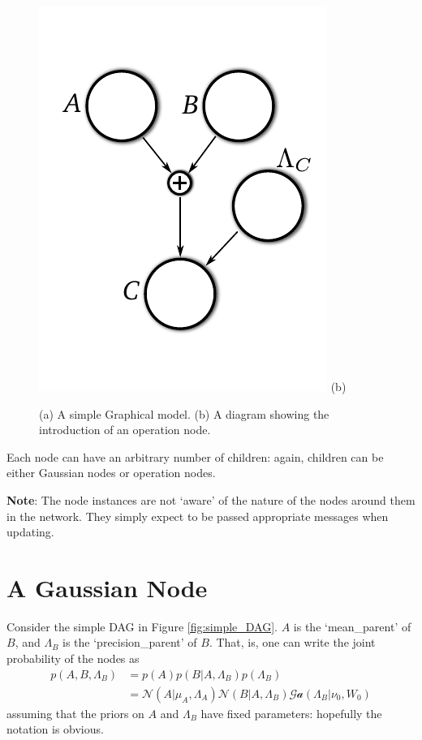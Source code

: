 \documentclass{article}
\newcommand{\<}{\langle}
\renewcommand{\>}{\rangle}
\begin{document}
\begin{figure}
\begin{minipage}{0.4\textwidth}
\begin{center}
\includegraphics[width=\textwidth]{images/gm_bastard}
(b)
\end{center}
\end{minipage}
\caption{(a) A simple Graphical model.  (b) A diagram showing the introduction of an operation node.}
\label{fig:gm_true_bastard}
\end{figure}


Each node can have an arbitrary number of children: again, children can be either Gaussian nodes or operation nodes. 

{\bf Note}: The node instances are not `aware' of the nature of the nodes around them in the network. They simply expect to be passed appropriate messages when updating. 


\section{A Gaussian Node}
Consider the simple DAG in Figure \ref{fig:simple_DAG}.  $A$ is the `mean\_parent' of $B$, and $\Lambda_B$ is the `precision\_parent' of $B$. That, is, one can write the joint probability of the nodes as
\begin{equation}
\begin{split}
p(A,B,\Lambda_B) &= p(A) p(B | A, \Lambda_B) p(\Lambda_B)\\
&= \mathcal N (A|\mu_A, \Lambda_A) \mathcal N (B | A, \Lambda_B) \mathcal {Ga}(\Lambda_B | \nu_0, W_0)
\end{split}
\end{equation}
assuming that the priors on $A$ and $\Lambda_B$ have fixed parameters: hopefully the notation is obvious.  
\end{document}
